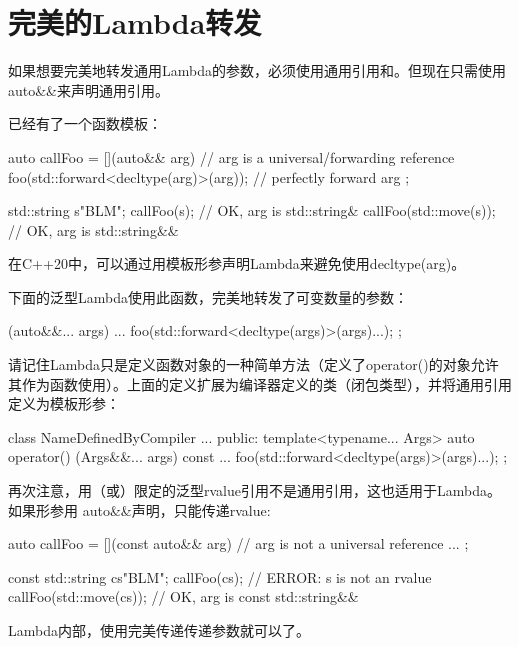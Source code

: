 \section{完美的Lambda转发}
如果想要完美地转发通用Lambda的参数，必须使用通用引用和。但现在只需使用auto\&\&来声明通用引用。

已经有了一个函数模板：

\begin{cppcode}
auto callFoo = [](auto&& arg) { // arg is a universal/forwarding reference
	foo(std::forward<decltype(arg)>(arg)); // perfectly forward arg
};

std::string s{"BLM"};
callFoo(s); // OK, arg is std::string&
callFoo(std::move(s)); // OK, arg is std::string&&
\end{cppcode}

在C++20中，可以通过用模板形参声明Lambda来避免使用decltype(arg)。

下面的泛型Lambda使用此函数，完美地转发了可变数量的参数：

\begin{cppcode}
[] (auto&&... args) {
	...
	foo(std::forward<decltype(args)>(args)...);
};
\end{cppcode}

请记住Lambda只是定义函数对象的一种简单方法（定义了operator()的对象允许其作为函数使用）。上面的定义扩展为编译器定义的类（闭包类型），并将通用引用定义为模板形参：

\begin{cppcode}
class NameDefinedByCompiler {
	...
	public:
	template<typename... Args>
	auto operator() (Args&&... args) const {
		...
		foo(std::forward<decltype(args)>(args)...);
	}
};
\end{cppcode}

再次注意，用（或）限定的泛型rvalue引用不是通用引用，这也适用于Lambda。如果形参用 auto\&\&声明，只能传递rvalue:

\begin{cppcode}
auto callFoo = [](const auto&& arg) { // arg is not a universal reference
	...
};

const std::string cs{"BLM"};
callFoo(cs); // ERROR: s is not an rvalue
callFoo(std::move(cs)); // OK, arg is const std::string&&
\end{cppcode}

Lambda内部，使用完美传递传递参数就可以了。
















































